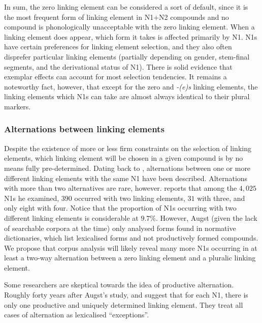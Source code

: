 In sum, the zero linking element can be considered a sort of default, since it is the most frequent form of linking element in N1+N2 compounds and no compound is phonologically unacceptable with the zero linking element.
When a linking element does appear, which form it takes is affected primarily by N1.
N1s have certain preferences for linking element selection, and they also often disprefer particular linking elements (partially depending on gender, stem-final segments, and the derivational status of N1).
There is solid evidence that exemplar effects can account for most selection tendencies.
It remains a noteworthy fact, however, that except for the zero and \textit{-(e)s} linking elements, the linking elements which N1s can take are almost always identical to their plural markers.

\subsubsection{Alternations between linking elements}

Despite the existence of more or less firm constraints on the selection of linking elements, which linking element will be chosen in a given compound is by no means fully pre-determined.
Dating back to \textcite{Augst1975}, alternations between one or more different linking elements with the same N1 have been described.
Alternations with more than two alternatives are rare, however.
\textcite[134--135]{Augst1975} reports that among the $4,025$ N1s he examined, $390$ occurred with two linking elements, $31$ with three, and only eight with four.
Notice that the proportion of N1s occurring with two different linking elements is considerable at $9.7\%$.
However, Augst (given the lack of searchable corpora at the time) only analysed forms found in normative dictionaries, which list lexicalised forms and not productively formed compounds.
We propose that corpus analysis will likely reveal many more N1s occurring in at least a two-way alternation between a zero linking element and a pluralic linking element.

Some researchers are skeptical towards the idea of productive alternation.
Roughly forty years after Augst's study, \textcite[31]{NeefBorgwaldt2012} and \textcite[46]{Neef2015} suggest that for each N1, there is only one productive and uniquely determined linking element.
They treat all cases of alternation as lexicalised ``exceptions''.


